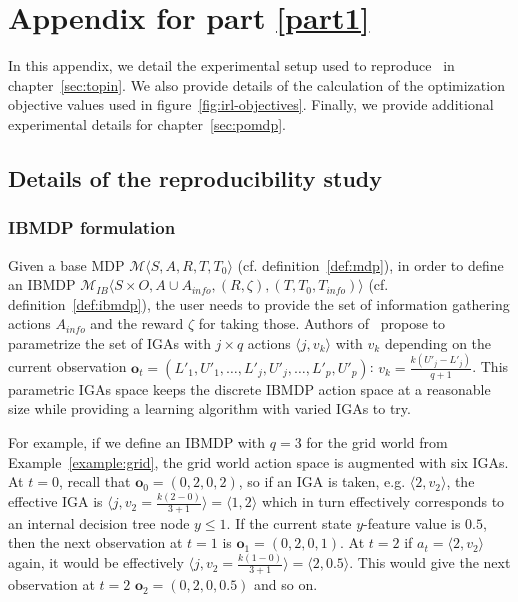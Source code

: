 \chapter{Appendix for part \ref{part1}}
\label{chap-app-pomdp}
In this appendix, we detail the experimental setup used to reproduce~\cite[table 1]{topin2021iterative} in chapter~\ref{sec:topin}.
We also provide details of the calculation of the optimization objective values used in figure~\ref{fig:irl-objectives}.
Finally, we provide additional experimental details for chapter~\ref{sec:pomdp}.
\section{Details of the reproducibility study}

\subsection{IBMDP formulation}\label{sec:ibmdp-paper}
Given a base MDP $\mathcal{M}\langle S, A, R, T, T_0\rangle$ (cf. definition~\ref{def:mdp}), in order to define an IBMDP $\mathcal{M}_{IB}\langle S\times O, A\cup A_{info}, (R, \zeta),( T, T_0, T_{info})\rangle$ (cf. definition~\ref{def:ibmdp}), the user needs to provide the set of information gathering actions $A_{info}$ and the reward $\zeta$ for taking those.
Authors of~\cite{topin2021iterative} propose to parametrize the set of IGAs with $j \times q$ actions $\langle j, v_k \rangle$ with $v_k$ depending on the current observation $\boldsymbol{o}_t=(L'_1, U'_1, \dots, L'_j, U'_j, \dots, L'_p, U'_p)$: $v_k = \frac{k(U'_j - L'_j)}{q+1}$.
This parametric IGAs space keeps the discrete IBMDP action space at a reasonable size while providing a learning algorithm with varied IGAs to try.

For example, if we define an IBMDP with $q=3$ for the grid world from Example~\ref{example:grid}, the grid world action space is augmented with six IGAs. 
At $t=0$, recall that $\boldsymbol{o}_0=(0, 2, 0, 2)$, so if an IGA is taken, e.g. $\langle 2, v_2\rangle$, the effective IGA is $\langle j, v_2=\frac{k(2-0)}{3+1}\rangle = \langle 1, 2 \rangle$ which in turn effectively corresponds to an internal decision tree node $y \leq 1$.
If the current state $y$-feature value is $0.5$, then the next observation at $t=1$ is $\boldsymbol{o}_1=(0, 2, 0, 1)$. At $t=2$ if $a_t=\langle 2, v_2 \rangle$ again, it would be effectively $\langle j, v_2=\frac{k(1-0)}{3+1}\rangle = \langle 2, 0.5 \rangle$. 
This would give the next observation at $t=2$ $\boldsymbol{o}_2=(0, 2, 0, 0.5)$ and so on. 

